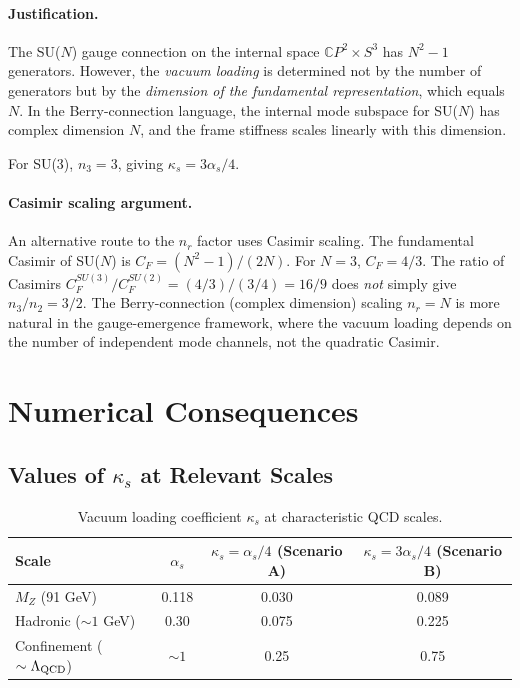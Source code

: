 \documentclass[11pt,letterpaper]{article}
\theoremstyle{definition}
\begin{document}
\paragraph{Justification.}
The SU($N$) gauge connection on the internal space
$\mathbb{C}P^2 \times S^3$ has $N^2 - 1$ generators.  However,
the \emph{vacuum loading} is determined not by the number of
generators but by the \emph{dimension of the fundamental
representation}, which equals $N$.  In the Berry-connection language,
the internal mode subspace for SU($N$) has complex dimension $N$,
and the frame stiffness scales linearly with this dimension.

For SU(3), $n_3 = 3$, giving $\kappa_s = 3\alpha_s/4$.

\paragraph{Casimir scaling argument.}
An alternative route to the $n_r$ factor uses Casimir scaling.
The fundamental Casimir of SU($N$) is $C_F = (N^2-1)/(2N)$.
For $N=3$, $C_F = 4/3$.  The ratio of Casimirs
$C_F^{SU(3)}/C_F^{SU(2)} = (4/3)/(3/4) = 16/9$ does \emph{not}
simply give $n_3/n_2 = 3/2$.  The Berry-connection (complex
dimension) scaling $n_r = N$ is more natural in the
gauge-emergence framework, where the vacuum loading depends on
the number of independent mode channels, not the quadratic Casimir.

\section{Numerical Consequences}\label{sec:numerics}

\subsection{Values of $\kappa_s$ at Relevant Scales}

\begin{table}[h]
\centering
\caption{Vacuum loading coefficient $\kappa_s$ at characteristic
QCD scales.}\label{tab:kappa-values}
\renewcommand{\arraystretch}{1.3}
\begin{tabular}{lccc}
\toprule
Scale & $\alpha_s$ & $\kappa_s = \alpha_s/4$ (Scenario A)
& $\kappa_s = 3\alpha_s/4$ (Scenario B) \\
\midrule
$M_Z$ (91 GeV) & 0.118 & 0.030 & 0.089 \\
Hadronic ($\sim 1$ GeV) & 0.30 & 0.075 & 0.225 \\
Confinement ($\sim \Lambda_{\rm QCD}$) & $\sim 1$ & 0.25 & 0.75 \\
\bottomrule
\end{tabular}
\end{table}
\end{document}
